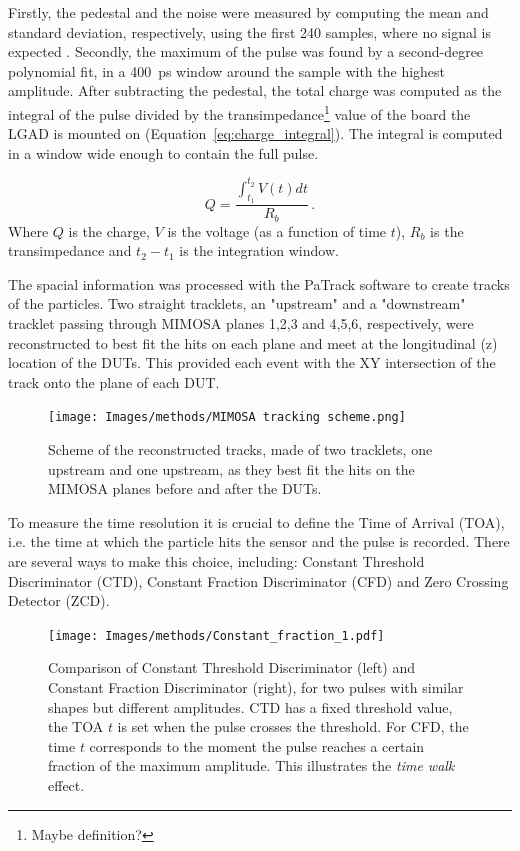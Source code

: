 Firstly, the pedestal and the noise were measured by computing the mean and standard deviation, respectively, using the first 240 samples, where no signal is expected \cite{Allaire:2018bof}. Secondly, the maximum of the pulse was found by a second-degree polynomial fit, in a \qty{400}{\pico\second} window around the sample with the highest amplitude. After subtracting the pedestal, the total charge was computed as the integral of the pulse divided by the transimpedance\footnote{Maybe definition?} value of the board the LGAD is mounted on (Equation~\ref{eq:charge_integral}). The integral is computed in a window wide enough to contain the full pulse.

\begin{equation}\label{eq:charge_integral}
    Q = \frac{\int_{t_1}^{t_2} V(t)dt}{R_b} \, .
\end{equation}
Where $Q$ is the charge, $V$ is the voltage (as a function of time $t$), $R_b$ is the transimpedance and $t_2-t_1$ is the integration window.

The spacial information was processed with the PaTrack software to create tracks of the particles. Two straight tracklets, an "upstream" and a "downstream" tracklet passing through MIMOSA planes 1,2,3 and 4,5,6, respectively, were reconstructed to best fit the hits on each plane and meet at the longitudinal (z) location of the DUTs. This provided each event with the XY intersection of the track onto the plane of each DUT. 

\begin{figure}[!hb]
    \centering
    \texttt{[image: Images/methods/MIMOSA tracking scheme.png]}
    \captionsetup{width=\captionwidth}
    \caption{Scheme of the reconstructed tracks, made of two tracklets, one upstream and one upstream, as they best fit the hits on the MIMOSA planes before and after the DUTs.}
    \label{fig:mimosa_tracking}
\end{figure} 


To measure the time resolution it is crucial to define the Time of Arrival (TOA), i.e. the time at which the particle hits the sensor and the pulse is recorded. There are several ways to make this choice, including: Constant Threshold Discriminator (CTD), Constant Fraction Discriminator (CFD) and Zero Crossing Detector (ZCD).

\begin{figure}[!hb]
    \centering
    \texttt{[image: Images/methods/Constant\_fraction\_1.pdf]}
    \captionsetup{width=\captionwidth}
    \caption{Comparison of Constant Threshold Discriminator (left) and Constant Fraction Discriminator (right), for two pulses with similar shapes but different amplitudes. CTD has a fixed threshold value, the TOA $t$ is set when the pulse crosses the threshold. For CFD, the time $t$ corresponds to the moment the pulse reaches a certain fraction of the maximum amplitude. This illustrates the \textit{time walk} effect.}
    \label{fig:constant fraction}
\end{figure} 

